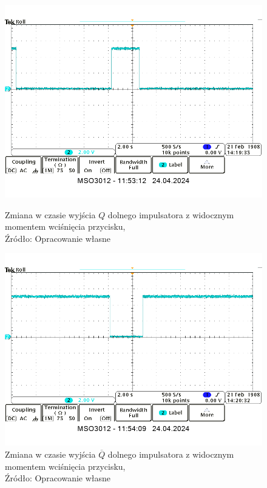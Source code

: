 \documentclass{article}
\begin{document}
      \begin{figure}[!ht]
        \begin{minipage}{.5\textwidth}
            \centering
            \includegraphics[scale=0.35]{grafiki/dol_Q.png}
            \caption{Zmiana w czasie wyjścia $Q$ dolnego impulsatora z widocznym momentem wciśnięcia przycisku,
            \\Źródło: Opracowanie własne}
        \end{minipage}
        \begin{minipage}{.5\textwidth}
            \centering
            \includegraphics[scale=0.35]{grafiki/dol_NQ.png} 
            \caption{Zmiana w czasie wyjścia $\overline{Q}$ dolnego impulsatora z widocznym momentem wciśnięcia przycisku,
            \\Źródło: Opracowanie własne}
        \end{minipage}
      \end{figure}
      \pagebreak
\end{document}
